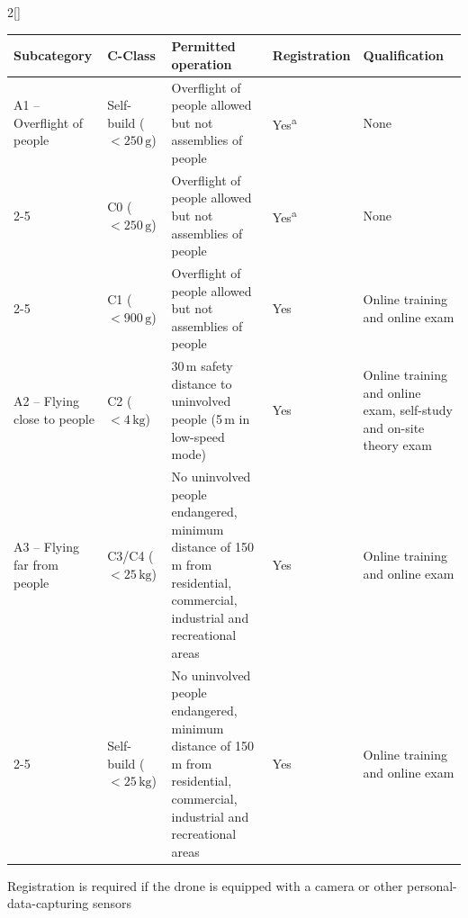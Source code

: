 \begin{paracol}{2}[]
\begin{table}[htb!]
\centering
\setlength{\tabcolsep}{4pt}       %
\renewcommand{\arraystretch}{1.5} %
\begin{threeparttable}
\scriptsize
\label{TabelleOpenCategory}
\begin{tabularx}{\textwidth}{X|l|X|l|X}
\toprule
Subcategory & C-Class & Permitted operation & Registration &  Qualification \\
\midrule
A1 -- Overflight of people
& \cellcolor{green}Self-build ($<250\,\mathrm{g}$) 
& Overflight of people allowed but not assemblies of people
& Yes\textsuperscript{a}
& None \\
\cline{2-5}
& C0 ($<250\,\mathrm{g}$) 
& Overflight of people allowed but not assemblies of people
& Yes\textsuperscript{a}
& None \\
\cline{2-5}
& C1 ($<900\,\mathrm{g}$) 
& Overflight of people allowed but not assemblies of people
& Yes
& Online training and online exam \\
\midrule
A2 -- Flying close to people
& C2 ($<4\,\mathrm{kg}$) 
& 30\,m safety distance to uninvolved people (5\,m in low-speed mode)
& Yes
& Online training and online exam, self-study and on-site theory exam \\
\midrule
A3 -- Flying far from people 
& C3/C4 ($<25\,\mathrm{kg}$)
& No uninvolved people endangered, minimum distance of 150\,m from residential, commercial, industrial and recreational areas 
& Yes
& Online training and online exam \\
\cline{2-5}
& \cellcolor{green}Self-build ($<25\,\mathrm{kg}$)
& No uninvolved people endangered, minimum distance of 150\,m from residential, commercial, industrial and recreational areas 
& Yes
& Online training and online exam \\
\bottomrule
\end{tabularx}
\begin{tablenotes}
\footnotesize
\item[a] Registration is required if the drone is equipped with a camera or other personal-data-capturing sensors
\end{tablenotes}
\end{threeparttable}
\end{table}

\FloatBarrier


\renewcommand{\deutschertitel}{Fernpiloten-ID und die UAS-Betreiber-Nummer erwerben}
\renewcommand{\englischertitel}{Obtaining the Remote Pilot ID and the UAS Operator Number}
\makrounterabschnitt
\label{AbschnittKompetenznachweisBetreiberNummer}


\end{paracol}
